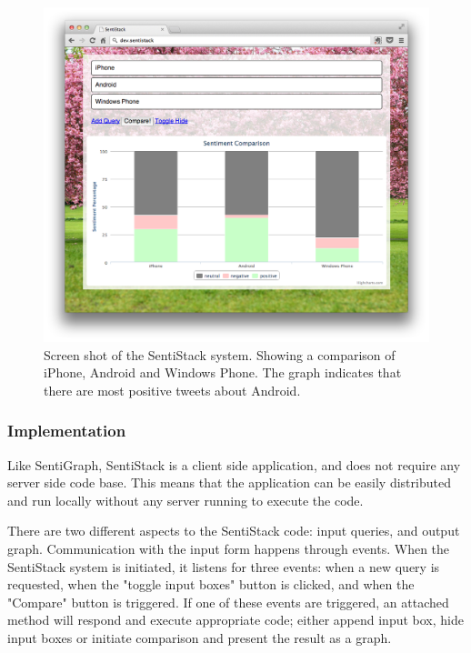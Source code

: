 \begin{figure}[htb!]
\begin{center}
 \includegraphics[width=\textwidth]{../img/sentistack_screenshot_full.png}
 \caption[SentiStack screen shot]{Screen shot of the SentiStack system. Showing a comparison of iPhone, Android and Windows Phone. The graph indicates that there are most positive tweets about Android.}
 \label{fig:sentistack_screenshot}
\end{center}
\end{figure}


\subsubsection{Implementation}

Like SentiGraph, SentiStack is a client side application, and does not require any server side code base. This means that the application can be easily distributed and run locally without any server running to execute the code. 

There are two different aspects to the SentiStack code: input queries, and output graph. Communication with the input form happens through events. When the SentiStack system is initiated, it listens for three events: when a new query is requested, when the "toggle input boxes" button is clicked, and when the "Compare" button is triggered. If one of these events are triggered, an attached method will respond and execute appropriate code; either append input box, hide input boxes or initiate comparison and present the result as a graph.

